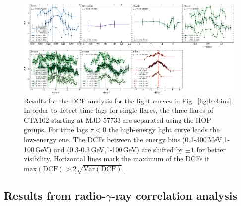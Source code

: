 \documentclass[twocolumn,linenumbers]{aastex62}
\newcommand{\gray}{$\gamma$-ray\xspace}
\begin{document}
\begin{figure}
    \centering
    \includegraphics[width = .9 \linewidth]{figures/zdcf_ebins.pdf}
    \caption{Results for the DCF analysis for the light curves in Fig.~\ref{fig:lcebins}. In order to detect time lags for single flares, the three flares of CTA102 starting at MJD 57733 are separated using the HOP groups. For time lags $\tau < 0$ the high-energy light curve leads the low-energy one. The DCFs between the energy bins (0.1-300\,MeV,1-100\,GeV) and (0.3-0.3\,GeV,1-100\,GeV) are shifted by $\pm 1$ for better visibility. 
    Horizontal lines mark the maximum of the DCFs if $\mathrm{max}(\mathrm{DCF}) > 2 \sqrt{\mathrm{Var}(\mathrm{DCF})}$.}
    \label{fig:zdcf}
\end{figure}



\subsection{Results from radio-\gray correlation analysis}
\label{sec:gammaradio}
\end{document}
